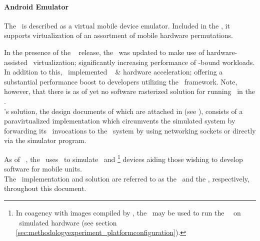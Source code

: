 \paragraph{Android Emulator}
\label{par:relatedwork_qemu_androidemulator}
The \dvttermandroidemulator\ is described as a virtual mobile device emulator.
Included in the \dvttermandroidsdk , it supports virtualization of an assortment of mobile hardware permutations.

In the presence of the \dvttermandroid\  release, the \dvttermandroidsdk\ was updated to make use of hardware-assisted \dvttermxeightysix\ virtualization; significantly increasing performance of \dvttermcpu -bound workloads.
In addition to this, \dvttermgoogle\ implemented \dvttermopengles\  \&  hardware acceleration; offering a substantial performance boost to developers utilizing the \dvttermopengles\ framework.
Note, however, that there is as of yet no software rasterized solution for running \dvttermopenglestwopointo\ in the \dvttermandroidemulator .\\

\noindent
\dvttermgoogle 's solution, the design documents of which are attached in  (see ), consists of a paravirtualized implementation which circumvents the simulated system by forwarding its \dvttermopengles\ invocations to the \dvttermhost\ system by using networking sockets or directly via the simulator program.

As of \dvttermandroid\ , the \dvttermandroidemulator\ uses \dvttermqemu\ to simulate \dvttermarm\ and \dvttermxeightysix \footnote{In coagency with images compiled by \dvttermintel , the \dvttermandroidemulator\ may be used to run the \dvttermandroid\ \dvttermos\ on \dvttermxeightysix\ simulated hardware (see section \ref{sec:methodologyexperiment_platformconfiguration}).} devices aiding those wishing to develop software for mobile units.\\

\noindent
The \dvttermandroidemulator\ implementation and solution are referred to as the \dvttermreferenceimplementation\ and the \dvttermreferencesolution , respectively, throughout this document.
